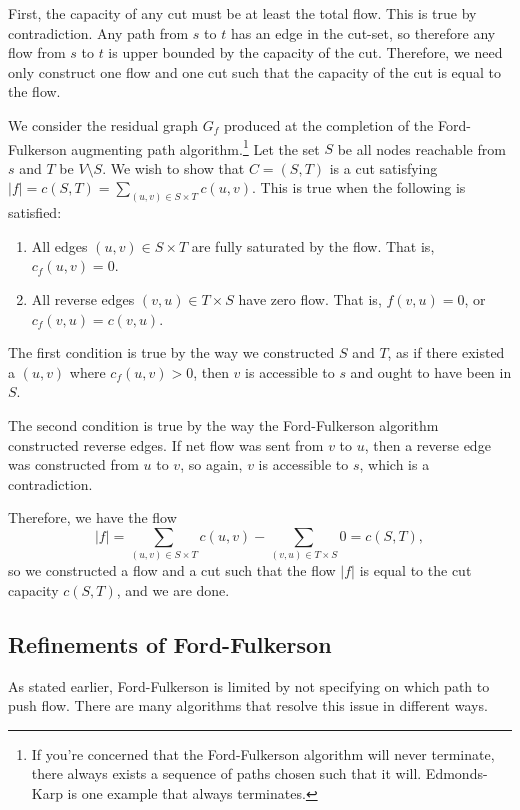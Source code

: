 First, the capacity of any cut must be at least the total flow. This is true by contradiction. Any path from $s$ to $t$ has an edge in the cut-set, so therefore any flow from $s$ to $t$ is upper bounded by the capacity of the cut. Therefore, we need only construct one flow and one cut such that the capacity of the cut is equal to the flow.

We consider the residual graph $G_f$ produced at the completion of the Ford-Fulkerson augmenting path algorithm.\footnote{If you're concerned that the Ford-Fulkerson algorithm will never terminate, there always exists a sequence of paths chosen such that it will. Edmonds-Karp is one example that always terminates.} Let the set $S$ be all nodes reachable from $s$ and $T$ be $V \setminus S$. We wish to show that $C=(S,T)$ is a cut satisfying $|f|=c(S,T)=\sum_{(u,v) \in S \times T} c(u,v)$. This is true when the following is satisfied:

\begin{enumerate}

\item
All edges $(u,v) \in S \times T$ are fully saturated by the flow. That is, $c_f(u,v) = 0$.

\item
All reverse edges $(v, u) \in T \times S$ have zero flow. That is, $f(v,u) = 0$, or $c_f(v,u) = c(v,u)$.

\end{enumerate}

The first condition is true by the way we constructed $S$ and $T$, as if there existed a $(u,v)$ where $c_f(u,v) > 0$, then $v$ is accessible to $s$ and ought to have been in $S$.

The second condition is true by the way the Ford-Fulkerson algorithm constructed reverse edges. If net flow was sent from $v$ to $u$, then a reverse edge was constructed from $u$ to $v$, so again, $v$ is accessible to $s$, which is a contradiction.

Therefore, we have the flow
\[|f|=\sum_{(u,v) \in S \times T} c(u,v) - \sum_{(v,u) \in T \times S} 0 = c(S,T),\]
so we constructed a flow and a cut such that the flow $|f|$ is equal to the cut capacity $c(S,T)$, and we are done.

\subsection{Refinements of Ford-Fulkerson}

As stated earlier, Ford-Fulkerson is limited by not specifying on which path to push flow. There are many algorithms that resolve this issue in different ways.


